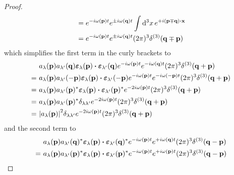 \begin{proof}
\begin{equation*}
\begin{split}
			&=
			e^{-i\omega(\vb{p})t}
			e^{\pm i\omega(\vb{q})t}
			\int\dd[3]{x}
			e^{+i(\vb{p}\mp\vb{q})\vdot\vb{x}}
			\\
			&=
			e^{-i\omega(\vb{p})t}
			e^{\pm i\omega(\vb{q})t}
			(2\pi)^3\delta^{(3)}(\vb{q}\mp\vb{p})
		\end{split}
	\end{equation*}
	which simplifies the first term in the curly brackets to
	\begin{equation*}
		\begin{split}
			&\
			a_\lambda(\vb{p})
			a_{\lambda^\prime}(\vb{q})
			\boldsymbol{\varepsilon}_\lambda(\vb{p})
			\vdot
			\boldsymbol{\varepsilon}_{\lambda^\prime}(\vb{q})
			e^{-i\omega(\vb{p})t}
			e^{-i\omega(\vb{q})t}
			(2\pi)^3\delta^{(3)}(\vb{q}+\vb{p})
			\\
			=&\
			a_\lambda(\vb{p})
			a_{\lambda^\prime}(-\vb{p})
			\boldsymbol{\varepsilon}_\lambda(\vb{p})
			\vdot
			\boldsymbol{\varepsilon}_{\lambda^\prime}(-\vb{p})
			e^{-i\omega(\vb{p})t}
			e^{-i\omega(-\vb{p})t}
			(2\pi)^3\delta^{(3)}(\vb{q}+\vb{p})
			\\
			=&\
			a_\lambda(\vb{p})
			a_{\lambda^\prime}(\vb{p})^*
			\boldsymbol{\varepsilon}_\lambda(\vb{p})
			\vdot
			\boldsymbol{\varepsilon}_{\lambda^\prime}(\vb{p})^*
			e^{-2i\omega(\vb{p})t}
			(2\pi)^3\delta^{(3)}(\vb{q}+\vb{p})
			\\
			=&\
			a_\lambda(\vb{p})
			a_{\lambda^\prime}(\vb{p})^*
			\delta_{\lambda\lambda^\prime}
			e^{-2i\omega(\vb{p})t}
			(2\pi)^3\delta^{(3)}(\vb{q}+\vb{p})
			\\
			=&\
			\abs{a_\lambda(\vb{p})}^2
			\delta_{\lambda\lambda^\prime}
			e^{-2i\omega(\vb{p})t}
			(2\pi)^3\delta^{(3)}(\vb{q}+\vb{p})
		\end{split}
	\end{equation*}
	and the second term to
	\begin{equation*}
		\begin{split}
			&\
			a_\lambda(\vb{p})
			a_{\lambda^\prime}(\vb{q})^*
			\boldsymbol{\varepsilon}_\lambda(\vb{p})
			\vdot
			\boldsymbol{\varepsilon}_{\lambda^\prime}(\vb{q})^*
			e^{-i\omega(\vb{p})t}
			e^{+i\omega(\vb{q})t}
			(2\pi)^3\delta^{(3)}(\vb{q}-\vb{p})
			\\
			=&\
			a_\lambda(\vb{p})
			a_{\lambda^\prime}(\vb{p})^*
			\boldsymbol{\varepsilon}_\lambda(\vb{p})
			\vdot
			\boldsymbol{\varepsilon}_{\lambda^\prime}(\vb{p})^*
			e^{-i\omega(\vb{p})t}
			e^{+i\omega(\vb{p})t}
			(2\pi)^3\delta^{(3)}(\vb{q}-\vb{p})
			\\

\end{split}
\end{equation*}
\end{proof}
